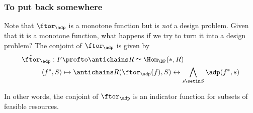 \subsubsection{To put back somewhere}
Note that $\ftor_\adp$ is a monotone function but is \emph{not} a design problem.
Given that it is a monotone function, what happens if we try to turn it into a design problem?
The conjoint of $\ftor_\adp$ is given by
\begin{equation}
    \begin{aligned}
        \hat \ftor_\adp : F    & \profto \antichains R \simeq \Hom_\DP(\ast, R) \\
        \langle f^*, S \rangle & \mapsto \antichains R(\ftor_\adp(f), S) \leftrightarrow \bigwedge_{s\setin S} \adp(f^*, s)
    \end{aligned}
\end{equation}

In other words, the conjoint of $\ftor_\adp$ is an indicator function for subsets of feasible resources.
